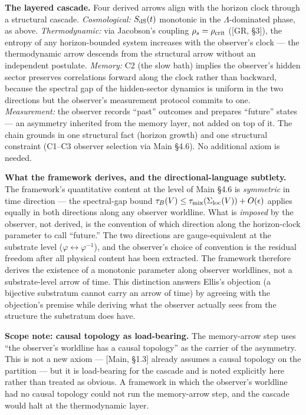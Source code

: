 \documentclass[
]{article}
\begin{document}
\textbf{The layered cascade.} Four derived arrows align with the horizon
clock through a structural cascade. \emph{Cosmological:}
\(S_{\rm dS}(t)\) monotonic in the \(\Lambda\)-dominated phase, as
above. \emph{Thermodynamic:} via Jacobson's coupling
\(\rho_s = \rho_{\rm crit}\) ({[}GR, §3{]}), the entropy of any
horizon-bounded system increases with the observer's clock --- the
thermodynamic arrow descends from the structural arrow without an
independent postulate. \emph{Memory:} C2 (the slow bath) implies the
observer's hidden sector preserves correlations forward along the clock
rather than backward, because the spectral gap of the hidden-sector
dynamics is uniform in the two directions but the observer's measurement
protocol commits to one. \emph{Measurement:} the observer records
``past'' outcomes and prepares ``future'' states --- an asymmetry
inherited from the memory layer, not added on top of it. The chain
grounds in one structural fact (horizon growth) and one structural
constraint (C1--C3 observer selection via Main §4.6). No additional
axiom is needed.

\textbf{What the framework derives, and the directional-language
subtlety.} The framework's quantitative content at the level of Main
§4.6 is \emph{symmetric} in time direction --- the spectral-gap bound
\(\tau_B(V) \leq \tau_{\rm mix}(\Sigma_{\rm loc}(V)) + O(\epsilon)\)
applies equally in both directions along any observer worldline. What is
\emph{imposed} by the observer, not derived, is the convention of which
direction along the horizon-clock parameter to call ``future.'' The two
directions are gauge-equivalent at the substrate level
(\(\varphi \leftrightarrow \varphi^{-1}\)), and the observer's choice of
convention is the residual freedom after all physical content has been
extracted. The framework therefore derives the existence of a monotonic
parameter along observer worldlines, not a substrate-level arrow of
time. This distinction answers Ellis's objection (a bijective substratum
cannot carry an arrow of time) by agreeing with the objection's premise
while deriving what the observer actually sees from the structure the
substratum does have.

\textbf{Scope note: causal topology as load-bearing.} The memory-arrow
step uses ``the observer's worldline has a causal topology'' as the
carrier of the asymmetry. This is not a new axiom --- {[}Main, §1.3{]}
already assumes a causal topology on the partition --- but it is
load-bearing for the cascade and is noted explicitly here rather than
treated as obvious. A framework in which the observer's worldline had no
causal topology could not run the memory-arrow step, and the cascade
would halt at the thermodynamic layer.
\end{document}
